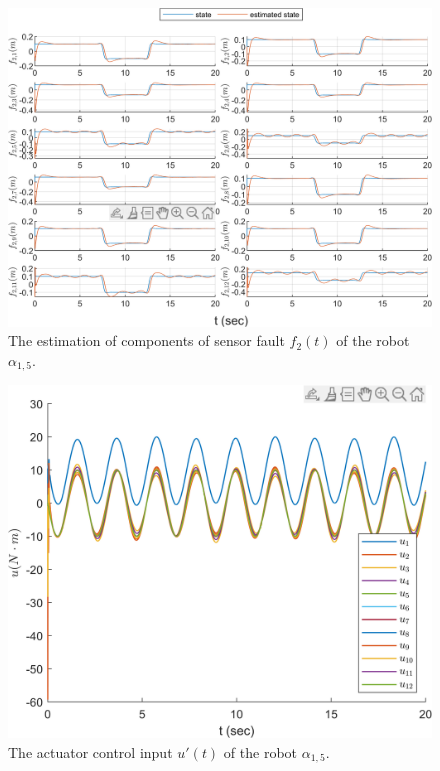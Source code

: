 \documentclass{ieeeaccess}
\begin{document}
\begin{figure}[htbp]
    \centering
    \includegraphics[scale=.57]{fig/robot (3).png}\caption{The estimation of components of sensor fault $f_2(t)$ of the robot $\alpha_{1,5}$.}%
    \label{fig:robot, fs}
\end{figure}
\begin{figure}[htbp]
    \centering
    \includegraphics[scale=.57]{fig/robot (4).png}\caption{The actuator control input $u'(t)$ of the robot $\alpha_{1,5}$.}%
    \label{fig:robot, control}
\end{figure}
\end{document}
